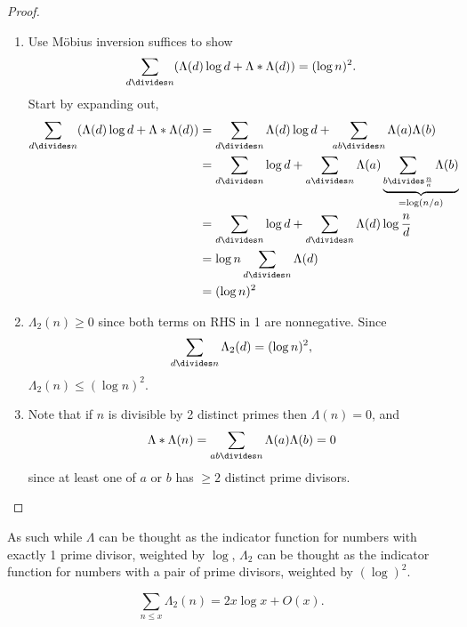 \documentclass[a4paper]{article}
\begin{document}
\begin{proof}\leavevmode
  \begin{enumerate}
  \item Use Möbius inversion suffices to show
    \[
      \sum_{d \divides n} (\Lambda(d) \log d + \Lambda * \Lambda(d)) = (\log n)^2.
    \]
    Start by expanding out,
    \begin{align*}
      \sum_{d \divides n} (\Lambda(d) \log d + \Lambda * \Lambda(d))
      &= \sum_{d \divides n} \Lambda(d) \log d + \sum_{ab \divides n} \Lambda(a) \Lambda(b) \\
      &= \sum_{d \divides n} \log d + \sum_{a \divides n} \Lambda(a) \underbrace{\sum_{b \divides \frac{n}{a}} \Lambda(b)}_{= \log (n/a)} \\
      &= \sum_{d \divides n} \log d + \sum_{d \divides n} \Lambda(d) \log \frac{n}{d} \\
      &= \log n \sum_{d \divides n} \Lambda(d) \\
      &= (\log n)^2
    \end{align*}
  \item \(\Lambda_2(n) \geq 0\) since both terms on RHS in 1 are nonnegative. Since
    \[
      \sum_{d \divides n} \Lambda_2(d) = (\log n)^2,
    \]
    \(\Lambda_2(n) \leq (\log n)^2\).
  \item Note that if \(n\) is divisible by 2 distinct primes then \(\Lambda(n) = 0\), and
    \[
      \Lambda * \Lambda(n) = \sum_{ab \divides n} \Lambda(a) \Lambda(b) = 0
    \]
    since at least one of \(a\) or \(b\) has \(\geq 2\) distinct prime divisors.
  \end{enumerate}
\end{proof}

As such while \(\Lambda\) can be thought as the indicator function for numbers with exactly 1 prime divisor, weighted by \(\log\), \(\Lambda_2\) can be thought as the indicator function for numbers with a pair of prime divisors, weighted by \((\log)^2\).

\begin{theorem}[Selberg]
  \[
    \sum_{n \leq x} \Lambda_2(n) = 2x \log x + O(x).
  \]
\end{theorem}
\end{document}
